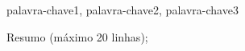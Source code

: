 \documentclass[tesedr]{eesc}
\begin{document}
\begin{resumo}{palavra-chave1, palavra-chave2, palavra-chave3}
	
Resumo (máximo 20 linhas);

\end{resumo}

%	







\sumario

\mainmatter









% 


\end{document}
